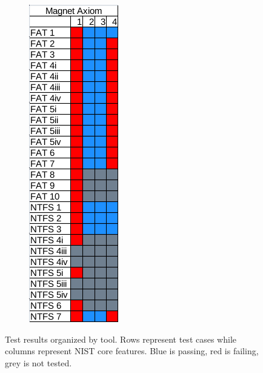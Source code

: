 \begin{figure}
\begin{subfigure}{0.16\linewidth}
    \end{subfigure}
    \begin{subfigure}{0.16\linewidth}
        \includegraphics[width=\linewidth]{fig/axiom_results.png}
    \end{subfigure}
        
    \caption{Test results organized by tool. Rows represent test cases while columns represent NIST core features. Blue is passing, red is failing, grey is not tested.}
    \label{fig:results}
\end{figure}

